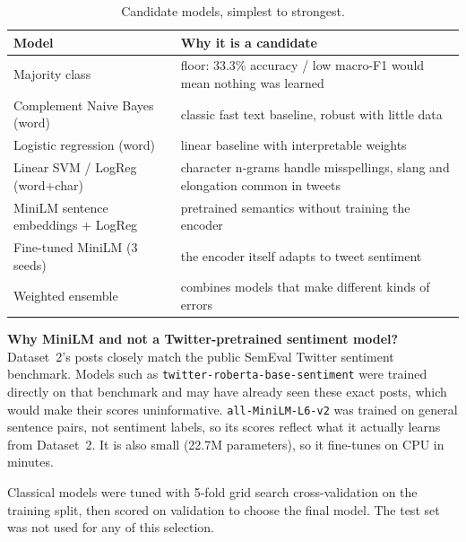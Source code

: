 \documentclass[11pt,a4paper]{article}
\begin{document}
\begin{table}[H]
\centering
\small
\begin{tabular}{@{}lp{9.5cm}@{}}
\toprule
\textbf{Model} & \textbf{Why it is a candidate} \\
\midrule
Majority class & floor: 33.3\% accuracy / low macro-F1 would mean nothing was learned \\
Complement Naive Bayes (word) & classic fast text baseline, robust with little data \\
Logistic regression (word) & linear baseline with interpretable weights \\
Linear SVM / LogReg (word+char) & character n-grams handle misspellings, slang and elongation common in tweets \\
MiniLM sentence embeddings + LogReg & pretrained semantics without training the encoder \\
Fine-tuned MiniLM (3 seeds) & the encoder itself adapts to tweet sentiment \\
Weighted ensemble & combines models that make different kinds of errors \\
\bottomrule
\end{tabular}
\caption{Candidate models, simplest to strongest.}
\end{table}

\textbf{Why MiniLM and not a Twitter-pretrained sentiment model?} Dataset~2's posts closely match the public SemEval Twitter sentiment benchmark. Models such as \texttt{twitter-roberta-base-sentiment} were trained directly on that benchmark and may have already seen these exact posts, which would make their scores uninformative. \texttt{all-MiniLM-L6-v2} was trained on general sentence pairs, not sentiment labels, so its scores reflect what it actually learns from Dataset~2. It is also small (22.7M parameters), so it fine-tunes on CPU in minutes.

Classical models were tuned with 5-fold grid search cross-validation on the training split, then scored on validation to choose the final model. The test set was not used for any of this selection.
\end{document}

